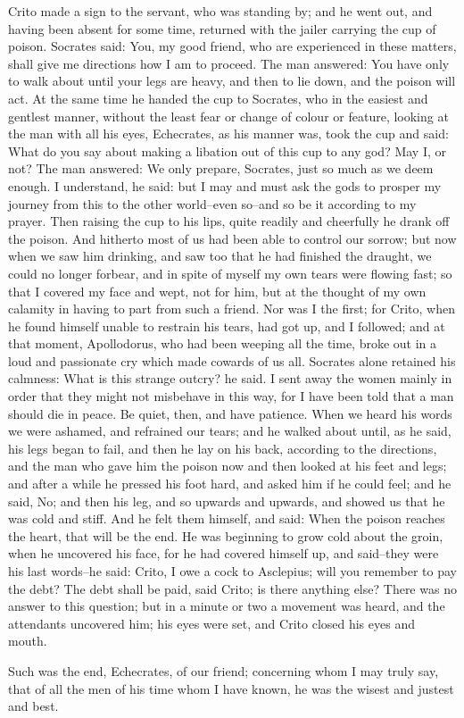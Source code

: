 Crito made a sign to the servant, who was standing by; and he went out,
and having been absent for some time, returned with the jailer
carrying the cup of poison. Socrates said: You, my good friend, who
are experienced in these matters, shall give me directions how I am to
proceed. The man answered: You have only to walk about until your legs
are heavy, and then to lie down, and the poison will act. At the same
time he handed the cup to Socrates, who in the easiest and gentlest
manner, without the least fear or change of colour or feature, looking
at the man with all his eyes, Echecrates, as his manner was, took the
cup and said: What do you say about making a libation out of this cup
to any god? May I, or not? The man answered: We only prepare, Socrates,
just so much as we deem enough. I understand, he said: but I may
and must ask the gods to prosper my journey from this to the other
world--even so--and so be it according to my prayer. Then raising the
cup to his lips, quite readily and cheerfully he drank off the poison.
And hitherto most of us had been able to control our sorrow; but now
when we saw him drinking, and saw too that he had finished the draught,
we could no longer forbear, and in spite of myself my own tears were
flowing fast; so that I covered my face and wept, not for him, but at
the thought of my own calamity in having to part from such a friend. Nor
was I the first; for Crito, when he found himself unable to restrain his
tears, had got up, and I followed; and at that moment, Apollodorus, who
had been weeping all the time, broke out in a loud and passionate cry
which made cowards of us all. Socrates alone retained his calmness: What
is this strange outcry? he said. I sent away the women mainly in order
that they might not misbehave in this way, for I have been told that
a man should die in peace. Be quiet, then, and have patience. When we
heard his words we were ashamed, and refrained our tears; and he walked
about until, as he said, his legs began to fail, and then he lay on his
back, according to the directions, and the man who gave him the poison
now and then looked at his feet and legs; and after a while he pressed
his foot hard, and asked him if he could feel; and he said, No; and then
his leg, and so upwards and upwards, and showed us that he was cold and
stiff. And he felt them himself, and said: When the poison reaches the
heart, that will be the end. He was beginning to grow cold about the
groin, when he uncovered his face, for he had covered himself up,
and said--they were his last words--he said: Crito, I owe a cock to
Asclepius; will you remember to pay the debt? The debt shall be
paid, said Crito; is there anything else? There was no answer to
this question; but in a minute or two a movement was heard, and the
attendants uncovered him; his eyes were set, and Crito closed his eyes
and mouth.

Such was the end, Echecrates, of our friend; concerning whom I may
truly say, that of all the men of his time whom I have known, he was the
wisest and justest and best.


